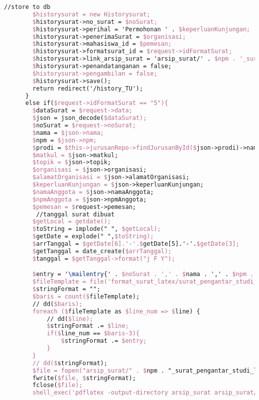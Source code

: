 \begin{lstlisting}[language=tex,basicstyle=\tiny,caption=HistorysuratController.php]
        //store to db
        $historysurat = new Historysurat;
        $historysurat->no_surat = $noSurat;
        $historysurat->perihal = 'Permohonan ' . $keperluanKunjungan;
        $historysurat->penerimaSurat = $organisasi;
        $historysurat->mahasiswa_id = $pemesan;
        $historysurat->formatsurat_id = $request->idFormatSurat;
        $historysurat->link_arsip_surat = 'arsip_surat/' . $npm . '_surat_pengantar_studi_lapangan_1orang.pdf';
        $historysurat->penandatanganan = false;
        $historysurat->pengambilan = false;
        $historysurat->save();
        return redirect('/history_TU');
      }
      else if($request->idFormatSurat == "5"){
        $dataSurat = $request->data;
        $json = json_decode($dataSurat);
        $noSurat = $request->noSurat;
        $nama = $json->nama;
        $npm = $json->npm;
        $prodi = $this->jurusanRepo->findJurusanById($json->prodi)->nama_jurusan;
        $matkul = $json->matkul;
        $topik = $json->topik;
        $organisasi = $json->organisasi;
        $alamatOrganisasi = $json->alamatOrganisasi;
        $keperluanKunjungan = $json->keperluanKunjungan;
        $namaAnggota = $json->namaAnggota;
        $npmAnggota = $json->npmAnggota;
        $pemesan = $request->pemesan;
         //tanggal surat dibuat
        $getLocal = getdate();
        $toString = implode(" ", $getLocal);
        $getDate = explode(" ",$toString);
        $arrTanggal = $getDate[6].'-'.$getDate[5].'-'.$getDate[3];
        $getTanggal = date_create($arrTanggal);
        $tanggal = $getTanggal->format("j F Y");

        $entry = '\mailentry{' . $noSurat . ',' . $nama . ',' . $npm . ',' . $prodi . ',' . $matkul . ',' . $topik . ',' . $organisasi . ',' . $alamatOrganisasi . ',' . $keperluanKunjungan . ',' . $namaAnggota . ',' . $npmAnggota . ',' . $tanggal .  '}';
        $fileTemplate = file('format_surat_latex/surat_pengantar_studi_lapangan_2orang.tex');
        $stringFormat = "";
        $baris = count($fileTemplate);
        // dd($baris);
        foreach ($fileTemplate as $line_num => $line) {
            // dd($line);
            $stringFormat .= $line;
            if($line_num == $baris-3){
                $stringFormat .= $entry;
            }
        }
        // dd($stringFormat);
        $file = fopen("arsip_surat/" . $npm . "_surat_pengantar_studi_lapangan_2orang.tex", "w");
        fwrite($file, $stringFormat);
        fclose($file);
        shell_exec('pdflatex -output-directory arsip_surat arsip_surat/' . $npm . '_surat_pengantar_studi_lapangan_2orang.tex');


\end{lstlisting}
